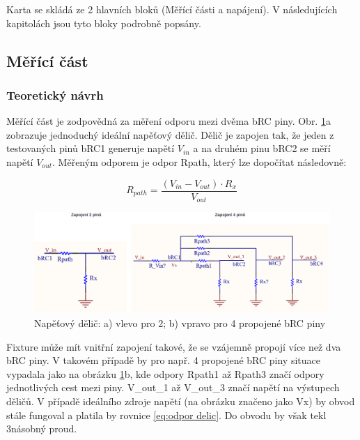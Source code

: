     Karta se skládá ze 2 hlavních bloků (Měřící části a napájení). V následujících kapitolách jsou tyto bloky
    podrobně popsány.
    \clearpage

    \subsection{Měřící část}
    \subsubsection{Teoretický návrh}
    Měřící část je zodpovědná za měření odporu mezi dvěma bRC piny.
    Obr. \ref{fig:Napěťový dělič pro 2 a 4 propojené bRC piny}a zobrazuje
    jednoduchý ideální napěťový dělič.
    Dělič je zapojen tak, že jeden z testovaných pinů bRC1 generuje napětí $V_{in}$
    a na druhém pinu bRC2 se měří napětí $V_{out}$.
    Měřeným odporem je odpor Rpath, který lze dopočítat následovně:
    
    \begin{equation}\label{eq:odpor delic}
        R_{path} = \frac{(V_{in} - V_{out}) \cdot R_x}{V_{out}}
    \end{equation}
    
\begin{figure}[ht!]
        \centering
        \includegraphics[width = 1\textwidth]{obrazky/2_and_4_pins_connection.png}
        \caption{Napěťový dělič: a) vlevo pro 2; b) vpravo pro 4 propojené bRC piny}
        \label{fig:Napěťový dělič pro 2 a 4 propojené bRC piny}
\end{figure}

Fixture může mít vnitřní zapojení takové, že se vzájemně propojí více než dva bRC piny.
V takovém případě by pro např. 4 propojené bRC piny situace
vypadala jako na obrázku \ref{fig:Napěťový dělič pro 2 a 4 propojené bRC piny}b,
kde odpory Rpath1 až Rpath3 značí odpory jednotlivých cest mezi piny. V\_out\_1 až V\_out\_3 značí napětí na
výstupech děličů. V případě ideálního zdroje napětí (na obrázku značeno jako Vx) by obvod stále fungoval a platila by
rovnice \ref{eq:odpor delic}. Do obvodu by však tekl 3násobný proud.\par

